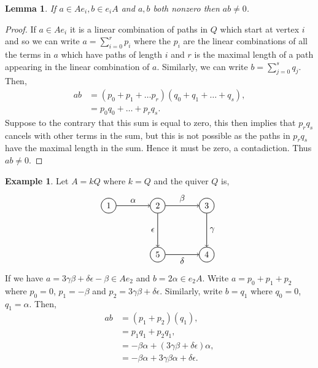 \documentclass[11.5pt, twoside, a4paper, titlepage]{report}
\theoremstyle{definition}
\newtheorem{eg}[mydef]{Example}
\theoremstyle{plain}
\newtheorem{lem}[mydef]{Lemma}
\begin{document}
\begin{lem} \label{idempotent0lem}
If $a \in Ae_i, b\in e_iA$ and $a,b$ both nonzero then $ab\neq 0$.
\end{lem}
\begin{proof}
If $a\in Ae_i$ it is a linear combination of paths in $Q$ which start at vertex $i$ and so we can write $a= \sum^r_{i=0}p_i$ where the $p_i$ are the linear combinations of all the terms in $a$ which have paths of length $i$ and $r$ is the maximal length of a path appearing in the linear combination of $a$. Similarly, we can write $b=\sum^s_{j=0}q_j$. Then,
\begin{align*}
ab&=(p_0 +p_1+ \dots p_r)(q_0+q_1+\dots+q_s),\\
&=p_0q_0+ \dots + p_rq_s.
\end{align*}
Suppose to the contrary that this sum is equal to zero, this then implies that $p_rq_s$ cancels with other terms in the sum, but this is not possible as the paths in $p_rq_s$ have the maximal length in the sum. Hence it must be zero, a contadiction. Thus $ab\neq0$.
\end{proof}

\begin{eg}
Let $A=kQ$ where $k= Q$ and the quiver $Q$ is,
\begin{equation*}
\begin{tikzpicture}[->,-latex, auto, every path/.style={->, semithick}, main node/.style={draw, circle}]
\node	[main node]		(1) at (0,0)		{1};
\node [main node]		(2) at (2,0)		{2};
\node [main node]		(3) at (4,0)		{3};
\node [main node]		(4) at (4,-2)		{4};
\node [main node]		(5) at (2,-2)		{5};

\draw (1) edge node [auto] {$\alpha$} (2);
\draw (2) edge node [auto] {$\beta$} (3);
\draw (3) edge node [auto] {$\gamma$} (4);
\draw (5) edge node [auto, swap] {$\delta$} (4);
\draw (2) edge node [auto, swap] {$\epsilon$} (5);
\end{tikzpicture}
\end{equation*}
If we have $a=3\gamma\beta +\delta\epsilon-\beta \in Ae_2$ and $b=2\alpha \in e_2A$. Write $a=p_0+p_1+p_2$ where $p_0=0$, $p_1=-\beta$ and $p_2=3\gamma\beta+\delta\epsilon$. Similarly, write $b=q_1$ where $q_0=0$, $q_1=\alpha$. Then,
\begin{align*}
ab&=(p_1+p_2)(q_1),\\
&=p_1q_1+p_2q_1,\\
&=-\beta\alpha + (3\gamma\beta+\delta\epsilon)\alpha,\\
&=-\beta\alpha+3\gamma\beta\alpha+\delta\epsilon.
\end{align*}
\end{eg}
\end{document}
